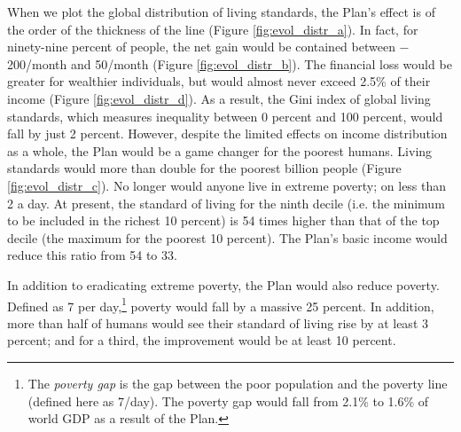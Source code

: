 \documentclass[a5paper,english,openany]{memoir}
\begin{document}


When we plot the global distribution of living standards, the Plan's effect is of the order of the thickness of the line (Figure \ref{fig:evol_distr_a}). In fact, %
for ninety-nine percent %
of people, the net gain would be contained between $-$200\textit{\texteuro{}}/month and 50\textit{\texteuro{}}/month (Figure \ref{fig:evol_distr_b}). The financial loss would be greater for wealthier individuals, but would almost never exceed 2.5\% of their %
income (Figure \ref{fig:evol_distr_d}). As a result, the Gini index of global living standards, which measures inequality between 0 percent and 100 percent, would fall by just 2 percent. 
However, despite the limited effects on income distribution as a whole, the Plan would be a game changer %
for the poorest humans. Living standards would more than double for the poorest billion people (Figure \ref{fig:evol_distr_c}). No longer would anyone live in extreme poverty; on less than \textit{\texteuro{}}2 a day. %
At present, the standard of living for the %
ninth decile (i.e. the minimum to be included in the richest 10 percent) is 54 times higher than that of the top %
decile (the maximum for the poorest 10 percent). The Plan's basic income would reduce this ratio from 54 to 33. 

In addition to eradicating extreme poverty, the Plan would also reduce poverty. Defined as \textit{\texteuro{}}7 per day,\footnote{The \textit{poverty gap} is the gap between the poor population and the poverty line (defined here as \textit{\texteuro{}}7/day). The poverty gap would fall from 2.1\% to 1.6\% of world GDP as a result of the Plan.} poverty would fall by a massive %
25 percent. %
In addition, more than half of humans would see their standard of living rise by at least 3 percent; and for a third, the improvement would be at least 10 percent. 
\end{document}
